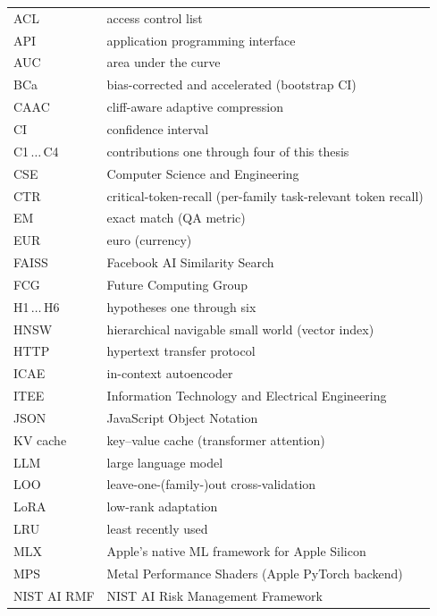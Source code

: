 \header{\headerabbreviations}
\setlongtables
\begin{longtable}[l]{p{3cm}p{}}

    ACL & access control list \\
    API & application programming interface \\
    AUC & area under the curve \\
    BCa & bias-corrected and accelerated (bootstrap CI) \\
    CAAC & cliff-aware adaptive compression \\
    CI & confidence interval \\
    C1\,$\dots$\,C4 & contributions one through four of this thesis \\
    CSE & Computer Science and Engineering \\
    CTR & critical-token-recall (per-family task-relevant token recall) \\
    EM & exact match (QA metric) \\
    EUR & euro (currency) \\
    FAISS & Facebook AI Similarity Search \\
    FCG & Future Computing Group \\
    H1\,$\dots$\,H6 & hypotheses one through six \\
    HNSW & hierarchical navigable small world (vector index) \\
    HTTP & hypertext transfer protocol \\
    ICAE & in-context autoencoder \\
    ITEE & Information Technology and Electrical Engineering \\
    JSON & JavaScript Object Notation \\
    KV cache & key--value cache (transformer attention) \\
    LLM & large language model \\
    LOO & leave-one-(family-)out cross-validation \\
    LoRA & low-rank adaptation \\
    LRU & least recently used \\
    MLX & Apple's native ML framework for Apple Silicon \\
    MPS & Metal Performance Shaders (Apple PyTorch backend) \\
    NIST AI RMF & NIST AI Risk Management Framework \\

\end{longtable}
